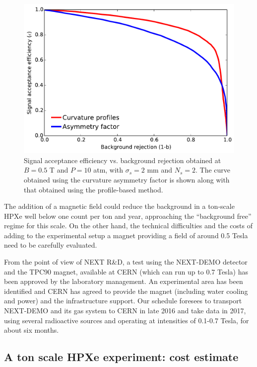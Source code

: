 \begin{figure}[!htb]
	\centering
	\includegraphics[scale=0.55]{img2/sigvsb_prof_vs_asymm.pdf}
	\caption{\label{fig_svsbprof}Signal acceptance efficiency vs. background rejection obtained at $B = 0.5$ T and $P = 10$ atm, with $\sigma_{s} = 2$ mm and $N_{s} = 2$.  The curve obtained using the curvature asymmetry factor is shown along with that obtained using the profile-based method.}
\end{figure}

The addition of a magnetic field could reduce the background in a ton-scale HPXe well below one count per ton and year, approaching the ``background free'' regime for this scale. On the other hand, the technical difficulties and the costs of adding to the experimental setup a magnet providing a field of around 0.5 Tesla need to be carefully evaluated. 

From the point of view of NEXT R\&D, a test using the NEXT-DEMO detector and the TPC90 magnet, available at CERN (which can run up to 0.7 Tesla) has been approved by the laboratory management. An experimental area has been identified and CERN has agreed to provide the magnet (including water cooling and power) and the infrastructure support. Our schedule foresees to transport NEXT-DEMO and its gas system to CERN in late 2016 and take data in 2017, using several radioactive sources and operating at intensities of 0.1-0.7 Tesla, for about six months.

\subsection{A ton scale HPXe experiment: cost estimate}
